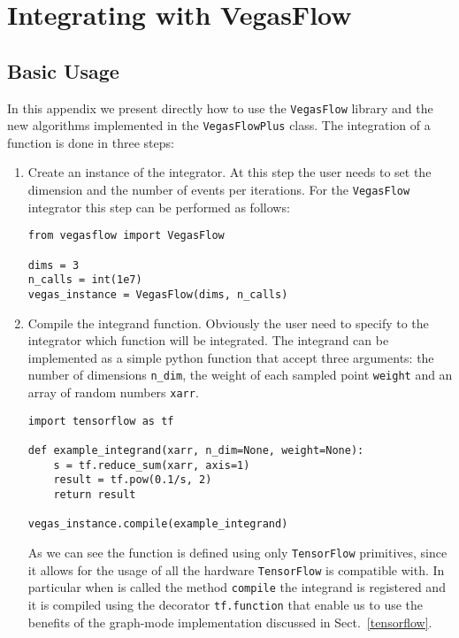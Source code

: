 \documentclass[../main/main.tex]{subfiles}
\begin{document}
\chapter{Integrating with VegasFlow}

\section{Basic Usage}
In this appendix we present directly how to use the \texttt{VegasFlow} library and the new algorithms implemented in the \texttt{VegasFlowPlus} class. The integration of a function is done in three steps:
\begin{enumerate}
	\item Create an instance of the integrator. At this step the user needs to set the dimension and the number of events per iterations. For the \texttt{VegasFlow} integrator this step can be performed as follows:
	\begin{verbatim}
from vegasflow import VegasFlow
		
dims = 3
n_calls = int(1e7)
vegas_instance = VegasFlow(dims, n_calls)
\end{verbatim}
\item Compile the integrand function. Obviously the user need to specify to the integrator which function will be integrated. The integrand can be implemented as a simple python function that accept three arguments: the number of dimensions \texttt{n\_dim}, the weight of each sampled point \texttt{weight} and an array of random numbers \texttt{xarr}.
\begin{verbatim}
import tensorflow as tf
	
def example_integrand(xarr, n_dim=None, weight=None):
	s = tf.reduce_sum(xarr, axis=1)
	result = tf.pow(0.1/s, 2)
	return result

vegas_instance.compile(example_integrand)
\end{verbatim}

As we can see the function is defined using only \texttt{TensorFlow} primitives, since it allows for the usage of all the hardware \texttt{TensorFlow} is compatible with. In particular when is called the method \texttt{compile} the integrand is registered and it is compiled using the decorator \texttt{tf.function} that enable us to use the benefits of the graph-mode implementation discussed in Sect.~\ref{tensorflow}.


\end{enumerate}
\end{document}
